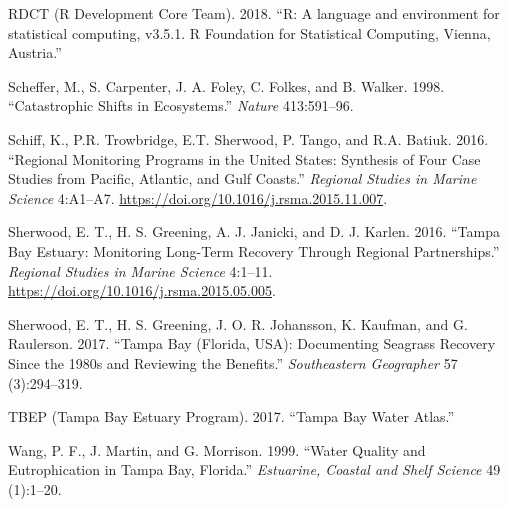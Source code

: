 \documentclass[]{article}
\begin{document}
\leavevmode\hypertarget{ref-RDCT18}{}%
RDCT (R Development Core Team). 2018. ``R: A language and environment
for statistical computing, v3.5.1. R Foundation for Statistical
Computing, Vienna, Austria.''

\leavevmode\hypertarget{ref-Scheffer98}{}%
Scheffer, M., S. Carpenter, J. A. Foley, C. Folkes, and B. Walker. 1998.
``Catastrophic Shifts in Ecosystems.'' \emph{Nature} 413:591--96.

\leavevmode\hypertarget{ref-Schiff16}{}%
Schiff, K., P.R. Trowbridge, E.T. Sherwood, P. Tango, and R.A. Batiuk.
2016. ``Regional Monitoring Programs in the United States: Synthesis of
Four Case Studies from Pacific, Atlantic, and Gulf Coasts.''
\emph{Regional Studies in Marine Science} 4:A1--A7.
\url{https://doi.org/10.1016/j.rsma.2015.11.007}.

\leavevmode\hypertarget{ref-Sherwood16}{}%
Sherwood, E. T., H. S. Greening, A. J. Janicki, and D. J. Karlen. 2016.
``Tampa Bay Estuary: Monitoring Long-Term Recovery Through Regional
Partnerships.'' \emph{Regional Studies in Marine Science} 4:1--11.
\url{https://doi.org/10.1016/j.rsma.2015.05.005}.

\leavevmode\hypertarget{ref-Sherwood17}{}%
Sherwood, E. T., H. S. Greening, J. O. R. Johansson, K. Kaufman, and G.
Raulerson. 2017. ``Tampa Bay (Florida, USA): Documenting Seagrass
Recovery Since the 1980s and Reviewing the Benefits.''
\emph{Southeastern Geographer} 57 (3):294--319.

\leavevmode\hypertarget{ref-TBEP17}{}%
TBEP (Tampa Bay Estuary Program). 2017. ``Tampa Bay Water Atlas.''

\leavevmode\hypertarget{ref-Wang99}{}%
Wang, P. F., J. Martin, and G. Morrison. 1999. ``Water Quality and
Eutrophication in Tampa Bay, Florida.'' \emph{Estuarine, Coastal and
Shelf Science} 49 (1):1--20.
\end{document}
